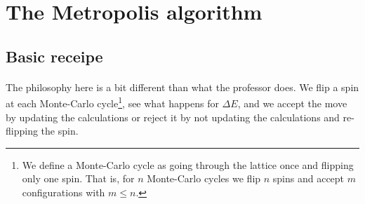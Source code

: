 \documentclass[a4paper, twoside, 11pt]{report}
\theoremstyle{theorem}
\theoremstyle{remark}
\theoremstyle{exemple}
\begin{document}
      
        
                
    \section{The Metropolis algorithm}
    
    	\subsection{Basic receipe}
	
	\paragraph{}The philosophy here is a bit different than what the professor does. We flip  a spin at each Monte-Carlo cycle\footnote{We define a Monte-Carlo cycle as going through the lattice once and flipping only one spin. That is, for $n$ Monte-Carlo cycles we flip $n$ spins and accept $m$ configurations with $m\leq n$.}, see what happens for $\Delta E$, and we accept the move by updating the calculations or reject it by not updating the calculations and re-flipping the spin.
        
\end{document}
